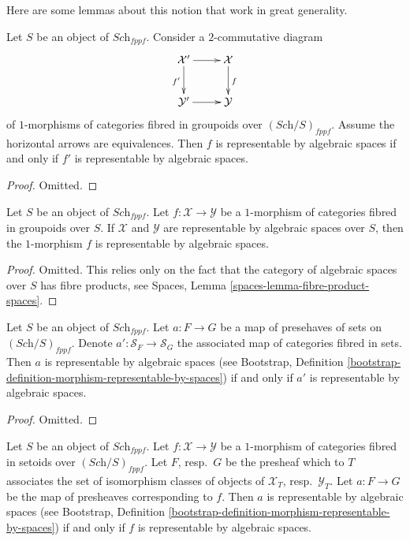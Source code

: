 \noindent
Here are some lemmas about this notion that work in great generality.

\begin{lemma}
\label{lemma-representable-by-spaces-morphism-equivalent}
Let $S$ be an object of $\textit{Sch}_{fppf}$.
Consider a $2$-commutative diagram
$$
\xymatrix{
\mathcal{X}' \ar[r] \ar[d]_{f'} & \mathcal{X} \ar[d]^f \\
\mathcal{Y}' \ar[r] & \mathcal{Y}
}
$$
of $1$-morphisms of categories fibred in groupoids over
$(\textit{Sch}/S)_{fppf}$.
Assume the horizontal arrows are equivalences.
Then $f$ is representable by algebraic spaces
if and only if $f'$ is representable by algebraic spaces.
\end{lemma}

\begin{proof}
Omitted.
\end{proof}

\begin{lemma}
\label{lemma-morphism-spaces-gives-representable-by-spaces}
Let $S$ be an object of $\textit{Sch}_{fppf}$.
Let $f : \mathcal{X} \to \mathcal{Y}$
be a $1$-morphism of categories fibred in groupoids over $S$.
If $\mathcal{X}$ and $\mathcal{Y}$ are representable by
algebraic spaces over $S$, then the $1$-morphism $f$
is representable by algebraic spaces.
\end{lemma}

\begin{proof}
Omitted. This relies only on the fact that
the category of algebraic spaces over $S$ has fibre products,
see Spaces, Lemma \ref{spaces-lemma-fibre-product-spaces}.
\end{proof}

\begin{lemma}
\label{lemma-map-presheaves-representable-by-algebraic-spaces}
Let $S$ be an object of $\textit{Sch}_{fppf}$.
Let $a : F \to G$ be a map of presehaves of sets on $(\textit{Sch}/S)_{fppf}$.
Denote $a' : \mathcal{S}_F  \to \mathcal{S}_G$ the associated
map of categories fibred in sets.
Then $a$ is representable by algebraic spaces (see
Bootstrap,
Definition \ref{bootstrap-definition-morphism-representable-by-spaces})
if and only if $a'$ is representable by algebraic spaces.
\end{lemma}

\begin{proof}
Omitted.
\end{proof}

\begin{lemma}
\label{lemma-map-fibred-setoids-representable-algebraic-spaces}
Let $S$ be an object of $\textit{Sch}_{fppf}$.
Let $f : \mathcal{X} \to \mathcal{Y}$ be a $1$-morphism of
categories fibred in setoids over $(\textit{Sch}/S)_{fppf}$.
Let $F$, resp.\ $G$ be the presheaf which to $T$ associates
the set of isomorphism classes of objects of
$\mathcal{X}_T$, resp.\ $\mathcal{Y}_T$.
Let $a : F \to G$ be the map of presheaves corresponding to $f$.
Then $a$ is representable by algebraic spaces (see
Bootstrap,
Definition \ref{bootstrap-definition-morphism-representable-by-spaces})
if and only if $f$ is representable by algebraic spaces.
\end{lemma}

